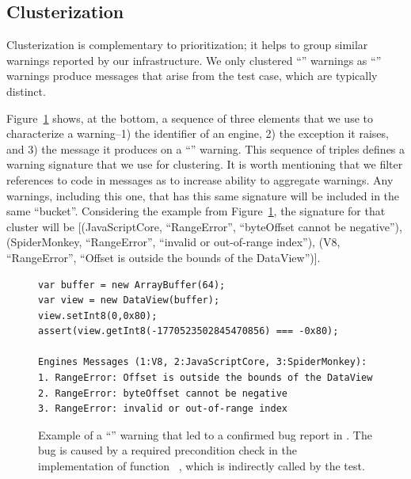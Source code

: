 \documentclass[smallextended]{svjour3}
\begin{document}
\subsection{Clusterization}
\label{sec:clusterization}


Clusterization is complementary to prioritization; it helps to group
similar warnings reported by our infrastructure. We only clustered
``\lo'' warnings as ``\hi'' warnings produce messages that arise from
the test case, which are typically distinct.

Figure~\ref{fig:lo-truepositive} shows, at the bottom, a sequence of
three elements that we use to characterize a warning--1) the
identifier of an engine, 2) the exception it raises, and 3) the
message it produces on a ``\lo'' warning.  This sequence of triples
defines a warning signature that we use for clustering. It is worth
mentioning that we filter references to code in messages as to
increase ability to aggregate warnings. Any warnings, including this
one, that has this same signature will be included in the same
``bucket''. Considering the example from
Figure~\ref{fig:lo-truepositive}, the signature for that cluster will
be [(JavaScriptCore, ``RangeError'', ``byteOffset cannot be
  negative''), (SpiderMonkey, ``RangeError'', ``invalid or
  out-of-range index''), (V8, ``RangeError'', ``Offset is outside the
  bounds of the DataView'')].

\begin{figure}[t!]
  \centering
  \begin{lstlisting}
var buffer = new ArrayBuffer(64);
var view = new DataView(buffer);
view.setInt8(0,0x80);
assert(view.getInt8(-1770523502845470856) === -0x80);

Engines Messages (1:V8, 2:JavaScriptCore, 3:SpiderMonkey):
1. RangeError: Offset is outside the bounds of the DataView
2. RangeError: byteOffset cannot be negative
3. RangeError: invalid or out-of-range index
  \end{lstlisting}
  \caption{\label{fig:lo-truepositive}Example of a ``\lo'' warning
    that led to a confirmed bug report in \chakra. The bug is caused
    by a required precondition check in the implementation of function
    ~\cite{ecmas262-getviewvalue}, which is indirectly called by the test. }
\end{figure}
\end{document}
